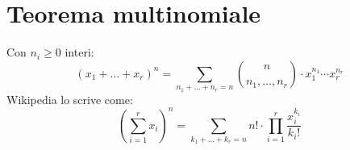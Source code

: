 \section{Teorema multinomiale}
Con $n_i \ge 0$ interi:
\[
\left( x_1 + \dots + x_r \right)^n = 
\sum_{n_1 + \dots + n_r = n} \binom{n}{n_1, \dots, n_r} \cdot x_1^{n_1} \cdots x_r^{n_r}
\]
Wikipedia lo scrive come:
\[
\left( \sum_{i=1}^r x_i \right)^n=\sum_{k_1+\ldots+k_r=n}{n!\cdot \prod_{i=1}^r \frac{x_i^{k_i}}{k_i!}}
\]



















